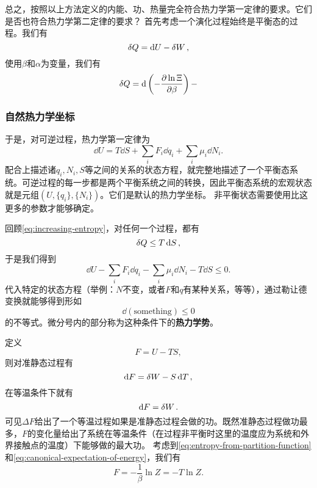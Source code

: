 \documentclass[hyperref, UTF8, a4paper]{ctexart}
\newcommand*{\ee}{\mathrm{e}}
\begin{document}
总之，按照以上方法定义的内能、功、热量完全符合热力学第一定律的要求。它们是否也符合热力学第二定律的要求？
首先考虑一个演化过程始终是平衡态的过程。我们有
\[
    \var{Q} = \dd{U} - \var{W},
\]
使用$\beta$和$\alpha$为变量，我们有
\[
    \var{Q} = \dd{\left( - \pdv{\ln\Xi}{\beta} \right)} - 
\]


\subsubsection{自然热力学坐标}\label{sec:natural-thermo-coor}

于是，对可逆过程，热力学第一定律为
\begin{equation}
    \dd{U} = T \dd{S} + \sum_i F_i \dd{q_i} + \sum_i \mu_i \dd{N_i}.
    \label{eq:equilibrium-first-law}
\end{equation}
配合上描述诸$q_i, N_i, S$等之间的关系的状态方程，就完整地描述了一个平衡态系统。可逆过程的每一步都是两个平衡系统之间的转换，因此平衡态系统的宏观状态就是元组$(U, \{q_i\}, \{N_i\})$。它们是默认的热力学坐标。
非平衡状态需要使用比这更多的参数才能够确定。

回顾\eqref{eq:increasing-entropy}，对任何一个过程，都有
\[
    \var{Q} \leq T \dd{S},
\]
于是我们得到
\begin{equation}
    \dd{U} - \sum_i F_i \dd{q_i} - \sum_i \mu_i \dd{N_i} - T \dd{S} \leq 0.
\end{equation}
代入特定的状态方程（举例：$N$不变，或者$F$和$q$有某种关系，等等），通过勒让德变换就能够得到形如
\[
    \dd{(\text{something})} \leq 0
\]
的不等式。微分号内的部分称为这种条件下的\textbf{热力学势}。

定义
\begin{equation}
    F = U - TS, 
\end{equation}
则对准静态过程有
\[
    \dd{F} = \var{W} - S \dd{T},
\]
在等温条件下就有
\[
    \dd{F} = \var{W}.
\]
可见$\Delta F$给出了一个等温过程如果是准静态过程会做的功。既然准静态过程做功最多，$F$的变化量给出了系统在等温条件（在过程非平衡时这里的温度应为系统和外界接触点的温度）下能够做的最大功。
考虑到\eqref{eq:entropy-from-partition-function}和\eqref{eq:canonical-expectation-of-energy}，我们有
\begin{equation}
    F = - \frac{1}{\beta} \ln Z = - T \ln Z.
\end{equation}
\end{document}
